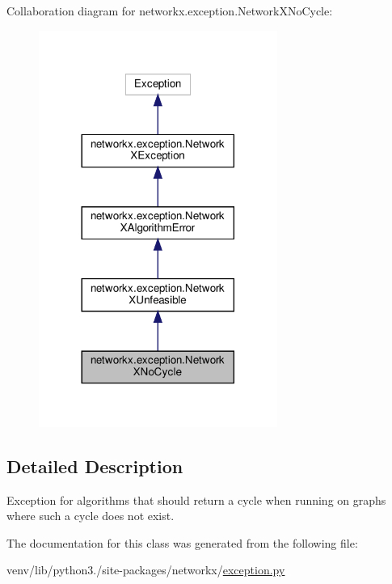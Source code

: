 Collaboration diagram for networkx.\+exception.\+Network\+X\+No\+Cycle\+:
\nopagebreak
\begin{figure}[H]
\begin{center}
\leavevmode
\includegraphics[width=221pt]{classnetworkx_1_1exception_1_1NetworkXNoCycle__coll__graph}
\end{center}
\end{figure}


\subsection{Detailed Description}
\begin{DoxyVerb}Exception for algorithms that should return a cycle when running
on graphs where such a cycle does not exist.\end{DoxyVerb}
 

The documentation for this class was generated from the following file\+:\begin{DoxyCompactItemize}
\item 
venv/lib/python3./site-\/packages/networkx/\hyperlink{exception_8py}{exception.\+py}\end{DoxyCompactItemize}
